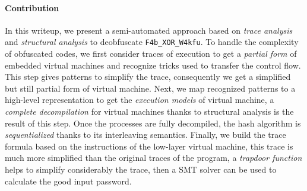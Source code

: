 \documentclass{easychair}
\begin{document}
\paragraph{Contribution}
In this writeup, we present a semi-automated approach based on \emph{trace analysis} and \emph{structural analysis} to deobfuscate \texttt{F4b\_XOR\_W4kfu}. To handle the complexity of obfuscated codes,  we first consider traces of execution to get a \emph{partial form} of embedded virtual machines and recognize tricks used to transfer the control flow. This step gives patterns to simplify the trace, consequently we get a simplified but still partial form of virtual machine. Next, we map recognized patterns to a high-level representation to get the \emph{execution models} of virtual machine, a \emph{complete decompilation} for virtual machines thanks to structural analysis is the result of this step. Once the processes are fully decompiled, the hash algorithm is \emph{sequentialized} thanks to its interleaving semantics. Finally, we build the trace formula based on the instructions of the low-layer virtual machine, this trace is much more simplified than the original traces of the program, a \emph{trapdoor function} helps to simplify considerably the trace, then a SMT solver can be used to calculate the good input password.

\end{document}
